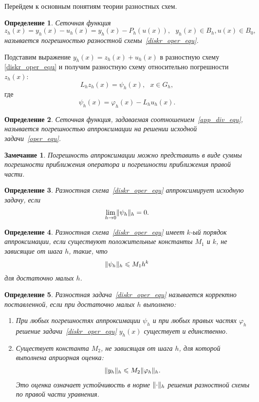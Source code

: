 \documentclass[11pt,a4paper,twoside]{report}
\numberwithin{equation}{section}
\newtheorem*{definition}{Определение}
\theoremstyle{definition}
\theoremstyle{plain}
\newtheorem*{note*}{Замечание}
\DeclarePairedDelimiter\norm{\lVert}{\rVert}
\begin{document}
Перейдем к основным понятиям теории разностных схем.
%
\begin{definition}
%
    Сеточная функция
    \begin{equation}
        \label{approx_sc}
        z_h(x)=y_h(x)-u_h(x)=y_h(x)-P_h(u(x)),~~~y_h(x) \in B_h, u(x) \in B_0,
    \end{equation}
    называется погрешностью разностной схемы~\eqref{diskr_oper_equ}.
%
\end{definition}
Подставим выражение $y_h(x)=z_h(x)+u_h(x)$ в разностную схему
\eqref{diskr_oper_equ} и получим разностную
схему относительно погрешности $z_h(x)$:
%
\begin{equation}
%
    \label{div_equ}
    L_hz_h(x)=\psi_h(x),~~~x\in G_h,
%
\end{equation}
%
где
%
\begin{equation}
%
    \label{app_div_equ}
    \psi_h(x)= \varphi_h(x)-L_hu_h(x).
%
\end{equation}
%
\begin{definition}
%
    Сеточная функция, задаваемая соотношением~\eqref{app_div_equ}, называется
    погрешностью аппроксимации на решении исходной задачи~\eqref{oper_equ}.
%
\end{definition}
%
\begin{note*}
%
    Погрешность аппроксимации можно представить в виде суммы погрешности приближения
    оператора и погрешности приближения правой части.
%
\end{note*}
%
\begin{definition}
%
    Разностная схема~\eqref{diskr_oper_equ} аппроксимирует исходную задачу, если
    $$
        \lim_{h\rightarrow0}\norm{\psi_h}_h=0.
    $$
%
\end{definition}
%
%
\begin{definition}
%
    Разностная схема~\eqref{diskr_oper_equ} имеет $k$-ый порядок аппроксимации,
    если существуют положительные константы $M_1$ и $k$, не зависящие от шага $h$,
    такие, что
    $$
        \norm{\psi_h}_h \leqslant M_1h^k
    $$
    для достаточно малых $h$.
%
\end{definition}
%
%
\begin{definition}
%
    Разностная задача~\eqref{diskr_oper_equ} называется корректно поставленной, если при
    достаточно малых $h$ выполнено:
    \begin{enumerate}
        \item
            При любых погрешностях аппроксимации $\psi_h$ и при любых правых
            частях $\varphi_h$ решение задачи~\eqref{diskr_oper_equ}
            $y_h(x)$ существует и единственно.
        \item
            Существует константа $M_2$, не зависящая от шага $h$, для которой
            выполнена априорная оценка:
            $$
                \norm{y_h}_h \leqslant M_2\norm{\varphi_h}_h.
            $$
            Это оценка означает устойчивость в норме $\norm{\cdot}_h$ решения разностной схемы
            по правой части уравнения.
    \end{enumerate}
%
\end{definition}
\end{document}
